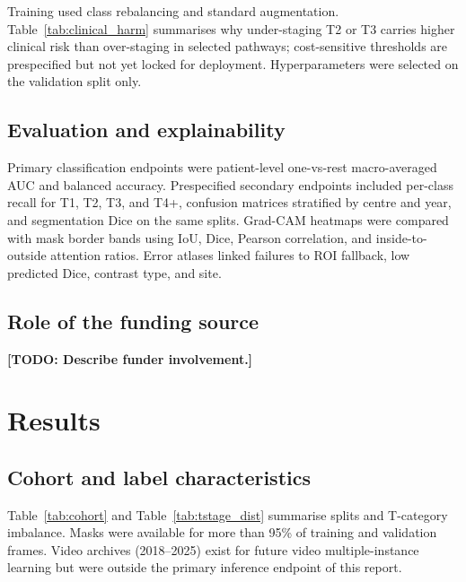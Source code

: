 \documentclass[11pt,a4paper]{article}
\newcommand{\todo}[1]{\textbf{[TODO: #1]}}
\begin{document}
Training used class rebalancing and standard augmentation. Table~\ref{tab:clinical_harm} summarises why under-staging T2 or T3 carries higher clinical risk than over-staging in selected pathways; cost-sensitive thresholds are prespecified but not yet locked for deployment. Hyperparameters were selected on the validation split only.

\subsection{Evaluation and explainability}
Primary classification endpoints were patient-level one-vs-rest macro-averaged AUC and balanced accuracy. Prespecified secondary endpoints included per-class recall for T1, T2, T3, and T4+, confusion matrices stratified by centre and year, and segmentation Dice on the same splits. Grad-CAM heatmaps were compared with mask border bands using IoU, Dice, Pearson correlation, and inside-to-outside attention ratios.\cite{gradcam} Error atlases linked failures to ROI fallback, low predicted Dice, contrast type, and site.

\subsection{Role of the funding source}
\todo{Describe funder involvement.}

\section{Results}




\subsection{Cohort and label characteristics}
Table~\ref{tab:cohort} and Table~\ref{tab:tstage_dist} summarise splits and T-category imbalance. Masks were available for more than 95\% of training and validation frames. Video archives (2018--2025) exist for future video multiple-instance learning but were outside the primary inference endpoint of this report.



\end{document}
